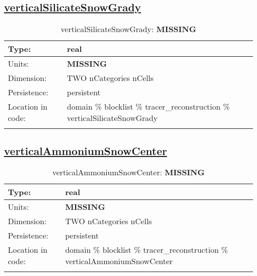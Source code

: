 \subsection[verticalSilicateSnowGrady]{\hyperref[sec:var_tab_tracer_reconstruction]{verticalSilicateSnowGrady}}
\label{subsec:var_sec_tracer_reconstruction_verticalSilicateSnowGrady}
\begin{center}
\begin{longtable}{| p{2.0in} | p{4.0in} |}
        \hline 
        Type: & real \\
        \hline 
        Units: & {\bf \color{red} MISSING} \\
        \hline 
        Dimension: & TWO nCategories nCells \\
        \hline 
        Persistence: & persistent \\
        \hline 
         Location in code: & domain \% blocklist \% tracer\_reconstruction \% verticalSilicateSnowGrady \\
         \hline 
    \caption{verticalSilicateSnowGrady: {\bf \color{red} MISSING}}
\end{longtable}
\end{center}
\subsection[verticalAmmoniumSnowCenter]{\hyperref[sec:var_tab_tracer_reconstruction]{verticalAmmoniumSnowCenter}}
\label{subsec:var_sec_tracer_reconstruction_verticalAmmoniumSnowCenter}
\begin{center}
\begin{longtable}{| p{2.0in} | p{4.0in} |}
        \hline 
        Type: & real \\
        \hline 
        Units: & {\bf \color{red} MISSING} \\
        \hline 
        Dimension: & TWO nCategories nCells \\
        \hline 
        Persistence: & persistent \\
        \hline 
         Location in code: & domain \% blocklist \% tracer\_reconstruction \% verticalAmmoniumSnowCenter \\
         \hline 
    \caption{verticalAmmoniumSnowCenter: {\bf \color{red} MISSING}}
\end{longtable}
\end{center}

